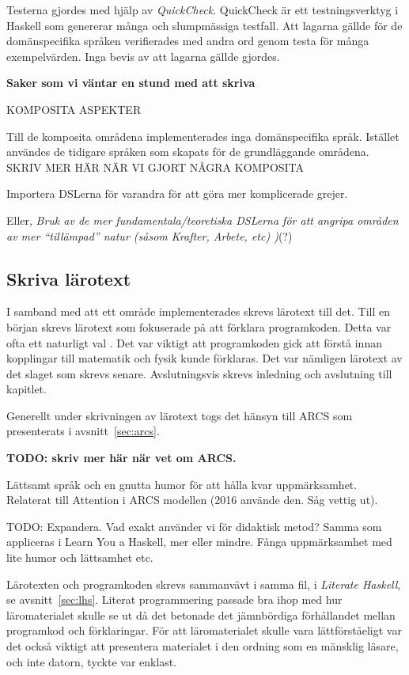 \begin{binge}
Testerna gjordes med hjälp av \textit{QuickCheck}. QuickCheck är ett testningsverktyg i Haskell som genererar många och slumpmässiga testfall. Att lagarna gällde för de domänspecifika språken verifierades med andra ord genom testa för många exempelvärden. Inga bevis av att lagarna gällde gjordes.

\textbf{Saker som vi väntar en stund med att skriva}

KOMPOSITA ASPEKTER

Till de komposita områdena implementerades inga domänspecifika språk. Istället användes de tidigare språken som skapats för de grundläggande områdena. SKRIV MER HÄR NÄR VI GJORT NÅGRA KOMPOSITA

Importera DSLerna för varandra för att göra mer komplicerade grejer.

Eller, \emph{Bruk av de mer fundamentala/teoretiska DSLerna för att
  angripa områden av mer ``tillämpad'' natur (såsom Krafter, Arbete,
  etc) )}(?)

\subsection{Skriva lärotext}

I samband med att ett område implementerades skrevs lärotext till det. Till en
början skrevs lärotext som fokuserade på att förklara programkoden. Detta var
ofta ett naturligt val . Det var viktigt att
programkoden gick att förstå innan kopplingar till matematik och fysik kunde
förklaras. Det var nämligen lärotext av det slaget som skrevs senare.
Avslutningsvis skrevs inledning och avslutning till kapitlet.

Generellt under skrivningen av lärotext togs det hänsyn till ARCS som
presenterats i avsnitt~\ref{sec:arcs}. 

\textbf{TODO: skriv mer här när vet om ARCS.}

Lättsamt språk och en gnutta humor för att hålla kvar
uppmärksamhet. Relaterat till Attention i ARCS modellen (2016
använde den. Såg vettig ut).

TODO: Expandera. Vad exakt använder vi för didaktisk metod? Samma
som appliceras i Learn You a Haskell, mer eller mindre. Fånga
uppmärksamhet med lite humor och lättsamhet etc.

Lärotexten och programkoden skrevs sammanvävt i samma fil, i \textit{Literate
Haskell}, se avsnitt~\ref{sec:lhs}. Literat programmering passade bra ihop med
hur läromaterialet skulle se ut då det betonade det jämnbördiga förhållandet
mellan programkod och förklaringar. För att läromaterialet skulle vara
lättförståeligt var det också viktigt att presentera materialet i den ordning
som en mänsklig läsare, och inte datorn, tyckte var enklast.


\end{binge}
